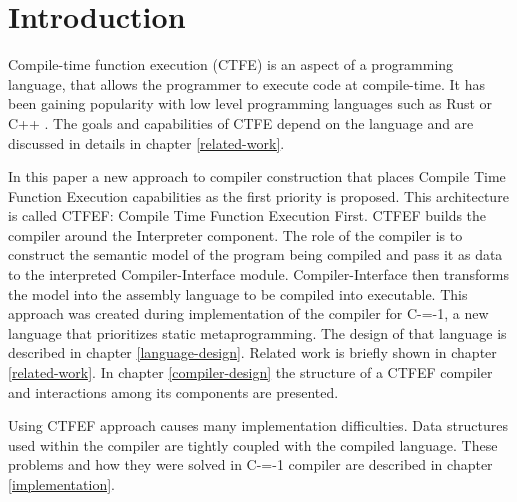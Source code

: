 \section{Introduction}


Compile-time function execution (CTFE) is an aspect of a programming language, that allows the programmer to execute code at compile-time.
It has been gaining popularity with low level programming languages such as Rust \cite{rust} or C++ \cite{ISO:cpp98}.
The goals and capabilities of CTFE depend on the language and are discussed in details in chapter \ref{related-work}.

In this paper a new approach to compiler construction that places Compile Time Function Execution capabilities as the first priority is proposed.
This architecture is called CTFEF: Compile Time Function Execution First. CTFEF builds the compiler around the Interpreter component.
The role of the compiler is to construct the semantic model of the program being compiled and pass it as data to the interpreted Compiler-Interface module.
Compiler-Interface then transforms the model into the assembly language to be compiled into executable.
This approach was created during implementation of the compiler for C-=-1, a new language that prioritizes static metaprogramming.
The design of that language is described in chapter \ref{language-design}.
Related work is briefly shown in chapter \ref{related-work}.
In chapter \ref{compiler-design} the structure of a CTFEF compiler and interactions among its components are presented.


Using CTFEF approach causes many implementation difficulties. Data structures used within the compiler are tightly coupled with the compiled language.
These problems and how they were solved in C-=-1 compiler are described in chapter \ref{implementation}.